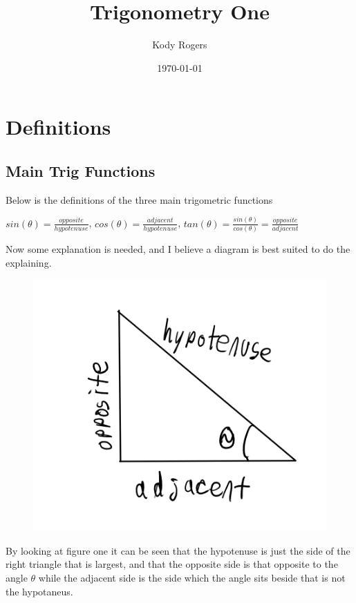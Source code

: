 \documentclass[12pt]{article}
\title{Trigonometry One}
\author{Kody Rogers}
\date{\today}
\begin{document}
\maketitle
\thispagestyle{empty}

\section{Definitions}
\subsection{Main Trig Functions}

Below is the definitions of the three main trigometric functions

$sin(\theta)=\frac{opposite}{hypotenuse}$,
$cos(\theta)=\frac{adjacent}{hypotenuse}$,
$tan(\theta)=\frac{sin(\theta)}{cos(\theta)} = \frac{opposite}{adjacent}$

Now some explanation is needed, and I believe a diagram is best suited to do the explaining.

\begin{figure}[h]
\includegraphics[scale=0.25]{TrigWorksheetTriangle1.png}
\end{figure}

By looking at figure one it can be seen that the hypotenuse is just the side of the right triangle that is largest, and that the opposite side is that opposite to the angle $\theta$ while the adjacent side is the side which the angle sits beside that is not the hypotaneus.
\end{document}
